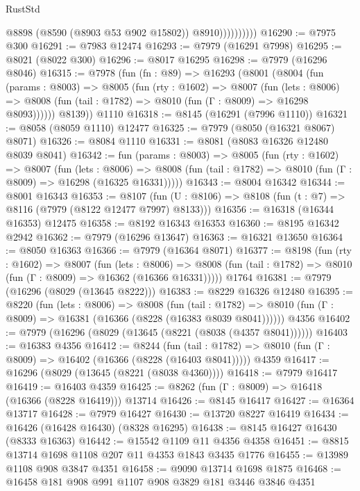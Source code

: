 \begin{lexlean}{RustStd}
\begin{coremodule}
                        @8898
                        (@8590 (@8903 @53 @902 @15802))
                        @8910))))))))))
@16290 := @7975 @300
@16291 := @7983 @12474
@16293 := @7979 (@16291 @7998)
@16295 := @8021 (@8022 @300)
@16296 := @8017 @16295
@16298 := @7979 (@16296 @8046)
@16315 := @7978
    (fun (fn : @89) =>
    @16293
      (@8001
        (@8004
          (fun (params : @8003) =>
          @8005
            (fun (rty : @1602) =>
            @8007
              (fun (lets : @8006) =>
              @8008 (fun (tail : @1782) => @8010 (fun (Γ : @8009) => @16298 @8093))))))
        @8139))
    @1110
@16318 := @8145 (@16291 (@7996 @1110))
@16321 := @8058 (@8059 @1110) @12477
@16325 := @7979 (@8050 (@16321 @8067) @8071)
@16326 := @8084 @1110
@16331 := @8081 (@8083 @16326 @12480 @8039 @8041)
@16342 := fun (params : @8003) =>
  @8005
    (fun (rty : @1602) =>
    @8007
      (fun (lets : @8006) =>
      @8008 (fun (tail : @1782) => @8010 (fun (Γ : @8009) => @16298 (@16325 @16331)))))
@16343 := @8004 @16342
@16344 := @8001 @16343
@16353 := @8107
    (fun (U : @8106) => @8108 (fun (t : @7) => @8116 (@7979 (@8122 @12477 @7997) @8133)))
@16356 := @16318 (@16344 @16353) @12475
@16358 := @8192 @16343 @16353
@16360 := @8195 @16342 @2942
@16362 := @7979 (@16296 @13647)
@16363 := @16321 @13650
@16364 := @8050 @16363
@16366 := @7979 (@16364 @8071)
@16377 := @8198
    (fun (rty : @1602) =>
    @8007
      (fun (lets : @8006) =>
      @8008 (fun (tail : @1782) => @8010 (fun (Γ : @8009) => @16362 (@16366 @16331)))))
    @1764
@16381 := @7979 (@16296 (@8029 (@13645 @8222)))
@16383 := @8229 @16326 @12480
@16395 := @8220
    (fun (lets : @8006) =>
    @8008
      (fun (tail : @1782) =>
      @8010 (fun (Γ : @8009) => @16381 (@16366 (@8228 (@16383 @8039 @8041))))))
    @4356
@16402 := @7979 (@16296 (@8029 (@13645 (@8221 (@8038 (@4357 @8041))))))
@16403 := @16383 @4356
@16412 := @8244
    (fun (tail : @1782) => @8010 (fun (Γ : @8009) => @16402 (@16366 (@8228 (@16403 @8041)))))
    @4359
@16417 := @16296 (@8029 (@13645 (@8221 (@8038 @4360))))
@16418 := @7979 @16417
@16419 := @16403 @4359
@16425 := @8262 (fun (Γ : @8009) => @16418 (@16366 (@8228 @16419))) @13714
@16426 := @8145 @16417
@16427 := @16364 @13717
@16428 := @7979 @16427
@16430 := @13720 @8227 @16419
@16434 := @16426 (@16428 @16430) (@8328 @16295)
@16438 := @8145 @16427 @16430 (@8333 @16363)
@16442 := @15542 @1109 @11 @4356 @4358
@16451 := @8815 @13714 @1698 @1108 @207 @11 @4353 @1843 @3435 @1776
@16455 := @13989 @1108 @908 @3847 @4351
@16458 := @9090 @13714 @1698 @1875
@16468 := @16458 @181 @908 @991 @1107 @908 @3829 @181 @3446 @3846 @4351

\end{coremodule}
\end{lexlean}
